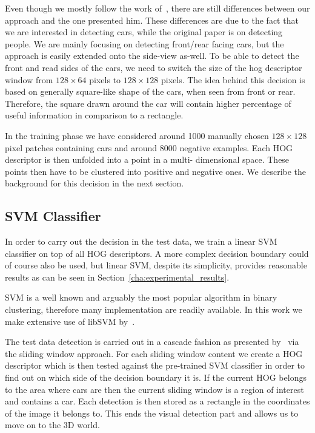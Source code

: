     Even though we mostly follow the work of~\cite{dalal2005}, there are still
    differences between our approach and the one presented him. These
    differences are due to the fact that we are interested in detecting cars,
    while the original paper is on detecting people. We are mainly focusing on
    detecting front/rear facing cars, but the approach is easily extended onto
    the side-view as-well. To be able to detect the front and read sides of
    the cars, we need to switch the size of the hog descriptor window from
    $128 \times 64$ pixels to $128 \times 128$ pixels. The idea behind this
    decision is based on generally square-like shape of the cars, when seen
    from front or rear. Therefore, the square drawn around the car will
    contain higher percentage of useful information in comparison to a
    rectangle.

    In the training phase we have considered around 1000 manually chosen $128
    \times 128$ pixel patches containing cars and around 8000 negative
    examples. Each HOG descriptor is then unfolded into a point in a multi-
    dimensional space. These points then have to be clustered into positive
    and negative ones. We describe the background for this decision in the
    next section.


    \subsection{SVM Classifier}\label{sub:svm_classifier}

        In order to carry out the decision in the test data, we train a linear
        SVM classifier on top of all HOG descriptors. A more complex decision
        boundary could of course also be used, but linear SVM, despite its
        simplicity, provides reasonable results as can be seen in
        Section~\ref{cha:experimental_results}.

        SVM is a well known and arguably the most popular algorithm in binary
        clustering, therefore many implementation are readily available. In
        this work we make extensive use of libSVM by~\cite{libSVM2011}.

        The test data detection is carried out in a cascade fashion as
        presented by~\cite{violajones2001} via the sliding window approach.
        For each sliding window content we create a HOG descriptor which is
        then tested against the pre-trained SVM classifier in order to find
        out on which side of the decision boundary it is. If the current HOG
        belongs to the area where cars are then the current sliding window is
        a region of interest and contains a car. Each detection is then stored
        as a rectangle in the coordinates of the image it belongs to. This
        ends the visual detection part and allows us to move on to the 3D
        world.

